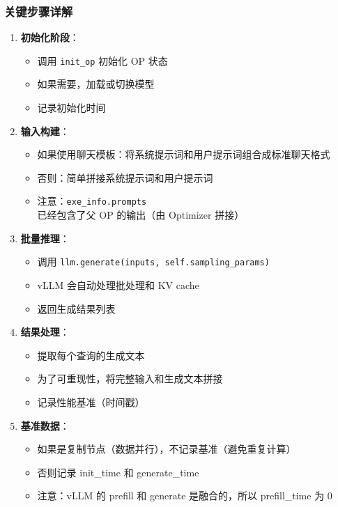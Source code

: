 \documentclass[12pt,a4paper]{article}
\begin{document}
\subsubsection{关键步骤详解}

\begin{enumerate}
    \item \textbf{初始化阶段}：
    \begin{itemize}
        \item 调用 \texttt{init\_op} 初始化 OP 状态
        \item 如果需要，加载或切换模型
        \item 记录初始化时间
    \end{itemize}
    
    \item \textbf{输入构建}：
    \begin{itemize}
        \item 如果使用聊天模板：将系统提示词和用户提示词组合成标准聊天格式
        \item 否则：简单拼接系统提示词和用户提示词
        \item 注意：\texttt{exe\_info.prompts} 已经包含了父 OP 的输出（由 Optimizer 拼接）
    \end{itemize}
    
    \item \textbf{批量推理}：
    \begin{itemize}
        \item 调用 \texttt{llm.generate(inputs, self.sampling\_params)}
        \item vLLM 会自动处理批处理和 KV cache
        \item 返回生成结果列表
    \end{itemize}
    
    \item \textbf{结果处理}：
    \begin{itemize}
        \item 提取每个查询的生成文本
        \item 为了可重现性，将完整输入和生成文本拼接
        \item 记录性能基准（时间戳）
    \end{itemize}
    
    \item \textbf{基准数据}：
    \begin{itemize}
        \item 如果是复制节点（数据并行），不记录基准（避免重复计算）
        \item 否则记录 init\_time 和 generate\_time
        \item 注意：vLLM 的 prefill 和 generate 是融合的，所以 prefill\_time 为 0
    \end{itemize}
\end{enumerate}
\end{document}
